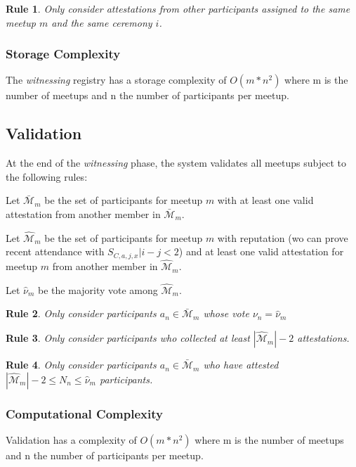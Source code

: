 \documentclass[conference]{IEEEtran}
\newtheorem{erule}{Rule}
\begin{document}
\begin{erule}
	Only consider attestations from \emph{other} participants \emph{assigned to the same meetup $m$} and the same ceremony $i$.
\end{erule}

\subsubsection{Storage Complexity}
The \emph{witnessing} registry has a storage complexity of $O(m*n^2)$ where m is the number of meetups and n the number of participants per meetup.

\subsection{Validation}
At the end of the \emph{witnessing} phase, the system validates all meetups subject to the following rules: 

Let $\mathcal{\bar M}_m$ be the set of participants for meetup $m$ with at least one valid attestation from another member in $\mathcal{\bar M}_m$.

Let $\mathcal{\hat M}_m$ be the set of participants for meetup $m$ with reputation (wo can prove recent attendance with $S_{C,a,j,x} |i-j<2$) and at least one valid attestation for meetup $m$ from another member in $\mathcal{\hat M}_m$.

Let $\hat\nu_m$ be the majority vote among $\mathcal{\hat M}_m$.

\begin{erule}\label{rule:votingcorrectly}
	Only consider participants $a_n \in \mathcal{\bar M}_m$ whose vote $\nu_n = \hat\nu_m$
\end{erule}

\begin{erule}
	Only consider participants who collected at least $|\mathcal{\hat M}_m|-2$ attestations.
\end{erule}
\begin{erule}\label{rule:hasattested}
	Only consider participants $a_n \in \mathcal{\bar M}_m$ who have attested $|\mathcal{\hat M}_m|-2 \leq N_n \leq \hat\nu_m$ participants.
\end{erule}

\subsubsection{Computational Complexity}
Validation has a complexity of $O(m*n^2)$ where m is the number of meetups and n the number of participants per meetup. 
\end{document}
